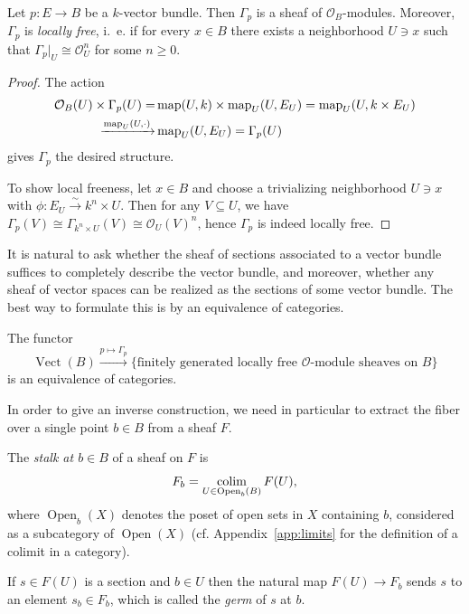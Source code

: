 \documentclass[a4paper,openany]{scrbook}
\DeclareMathOperator{\Vect}{Vect}
\DeclareMathOperator{\Open}{Open}
\begin{document}
\begin{prop}
Let $p\colon E \to B$ be a $k$-vector bundle. Then $\Gamma_p$ is a sheaf of $\mathcal O_B$-modules. Moreover, $\Gamma_p$ is \emph{locally free}, i.~e. if for every $x \in B$ there exists a neighborhood $U \ni x$ such that $\Gamma_p|_U \cong \mathcal O_U^n$ for some $n \geq 0$.
\end{prop}
\begin{proof}
The action
\begin{align*}
\mathcal O_B(U) \times \Gamma_p(U) =& \operatorname{map}(U,k) \times \operatorname{map}_U(U,E_U) = \operatorname{map}_U(U,k\times E_U)\\
\xrightarrow{\operatorname{map}_U(U,\cdot)} &\operatorname{map}_U(U,E_U) = \Gamma_p(U)
\end{align*}
gives $\Gamma_p$ the desired structure.

To show local freeness, let $x \in B$ and choose a trivializing neighborhood $U \ni x$ with $\phi\colon E_U \xrightarrow{\sim} k^n \times U$. Then for any $V \subseteq U$, we have $\Gamma_p(V) \cong \Gamma_{k^n \times U}(V) \cong \mathcal O_U(V)^n$, hence $\Gamma_p$ is indeed locally free.
\end{proof}

It is natural to ask whether the sheaf of sections associated to a vector bundle suffices to completely describe the vector bundle, and moreover, whether any sheaf of vector spaces can be realized as the sections of some vector bundle. The best way to formulate this is by an equivalence of categories.

\begin{thm}\label{thm:vbsheafequivalence}
The functor
\[
\Vect(B) \xrightarrow{p \mapsto \Gamma_p} \{\text{finitely generated locally free $\mathcal O$-module sheaves on $B$}\}
\]
is an equivalence of categories.
\end{thm}

In order to give an inverse construction, we need in particular to extract the fiber over a single point $b \in B$ from a sheaf $F$.

\begin{defn}
The \emph{stalk at $b \in B$} of a sheaf on $F$ is
\[
F_b = \colim_{U \in \Open_b(B)} F(U),
\]
where $\Open_b(X)$ denotes the poset of open sets in $X$ containing $b$, considered as a subcategory of $\Open(X)$ (cf. Appendix~\ref{app:limits} for the definition of a colimit in a category).

If $s \in F(U)$ is a section and $b \in U$ then the natural map $F(U) \to F_b$ sends $s$ to an element $s_b \in F_b$, which is called the \emph{germ} of $s$ at $b$.
\end{defn}
\end{document}
